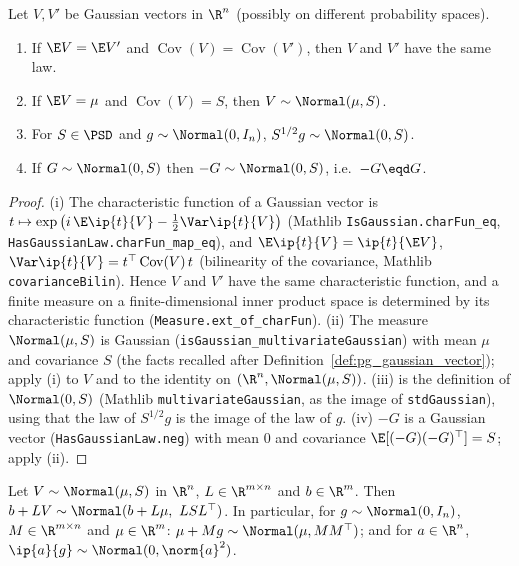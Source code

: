 \begin{lemma}
\label{lem:gauss_law_of_cov}
Let $V, V'$ be Gaussian vectors in $\R^n$ (possibly on different probability spaces).
\begin{enumerate}
  \item[(i)] If $\E V = \E V'$ and $\operatorname{Cov}(V) = \operatorname{Cov}(V')$, then $V$
        and $V'$ have the same law.
  \item[(ii)] If $\E V = \mu$ and $\operatorname{Cov}(V) = S$, then $V \sim \Normal(\mu, S)$.
  \item[(iii)] For $S \in \PSD$ and $g \sim \Normal(0, I_n)$, $S^{1/2} g \sim \Normal(0,S)$.
  \item[(iv)] If $G \sim \Normal(0, S)$ then $-G \sim \Normal(0,S)$, i.e.\ $-G \eqd G$.
\end{enumerate}
\end{lemma}

\begin{proof}
(i) The characteristic function of a Gaussian vector is
$t \mapsto \exp\big(i\,\E\ip{t}{V} - \tfrac12\Var\ip{t}{V}\big)$
(Mathlib \texttt{IsGaussian.charFun\_eq}, \texttt{HasGaussianLaw.charFun\_map\_eq}), and
$\E\ip{t}{V} = \ip{t}{\E V}$, $\Var\ip{t}{V} = t^\top\operatorname{Cov}(V)\,t$ (bilinearity of
the covariance, Mathlib \texttt{covarianceBilin}). Hence $V$ and $V'$ have the same
characteristic function, and a finite measure on a finite-dimensional inner product space is
determined by its characteristic function (\texttt{Measure.ext\_of\_charFun}). (ii) The
measure $\Normal(\mu,S)$ is Gaussian (\texttt{isGaussian\_multivariateGaussian}) with mean
$\mu$ and covariance $S$ (the facts recalled after Definition~\ref{def:pg_gaussian_vector});
apply (i) to $V$ and to the identity on $(\R^n, \Normal(\mu,S))$. (iii) is the definition of
$\Normal(0,S)$ (Mathlib \texttt{multivariateGaussian}, as the image of \texttt{stdGaussian}),
using that the law of $S^{1/2}g$ is the image of the law of $g$. (iv) $-G$ is a Gaussian
vector (\texttt{HasGaussianLaw.neg}) with mean $0$ and covariance
$\E[(-G)(-G)^\top] = S$; apply (ii).
\end{proof}

\begin{lemma}\label{lem:gauss_linear_image}
Let $V \sim \Normal(\mu, S)$ in $\R^n$, $L \in \R^{m \times n}$ and $b \in \R^m$. Then
$b + LV \sim \Normal(b + L\mu,\ L S L^\top)$. In particular, for $g \sim \Normal(0, I_n)$,
$M \in \R^{m\times n}$ and $\mu \in \R^m$: $\mu + Mg \sim \Normal(\mu, MM^\top)$; and for
$a \in \R^n$, $\ip{a}{g} \sim \Normal(0, \norm{a}^2)$.
\end{lemma}

